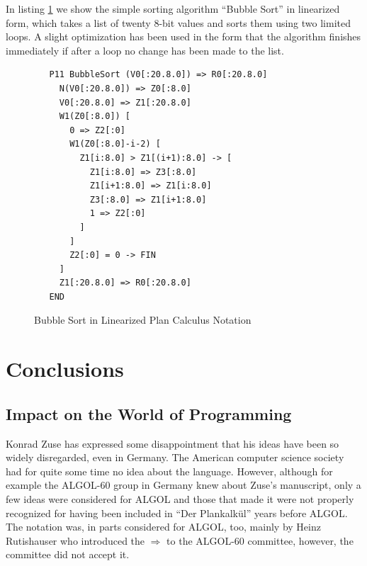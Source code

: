 \documentclass{llncs}
\begin{document}
 In listing \ref{fig:bubblesort} we show the simple sorting algorithm ``Bubble Sort'' in linearized form, 
 which takes a list of twenty 8-bit values and sorts them using two limited loops. A slight optimization has
 been used in the form that the algorithm finishes immediately if after a loop no change has been made
 to the list.
 \begin{figure}
   \begin{lstlisting}
   P11 BubbleSort (V0[:20.8.0]) => R0[:20.8.0]
     N(V0[:20.8.0]) => Z0[:8.0]
     V0[:20.8.0] => Z1[:20.8.0]
     W1(Z0[:8.0]) [
       0 => Z2[:0]
       W1(Z0[:8.0]-i-2) [
         Z1[i:8.0] > Z1[(i+1):8.0] -> [
           Z1[i:8.0] => Z3[:8.0]
           Z1[i+1:8.0] => Z1[i:8.0]
           Z3[:8.0] => Z1[i+1:8.0]
           1 => Z2[:0]
         ]
       ]
       Z2[:0] = 0 -> FIN
     ]
     Z1[:20.8.0] => R0[:20.8.0]
   END
   \end{lstlisting}
   \caption{Bubble Sort in Linearized Plan Calculus Notation}
   \label{fig:bubblesort}
 \end{figure}

 \section{Conclusions}
 \subsection{Impact on the World of Programming}
   Konrad Zuse has expressed some disappointment that his ideas have
   been so widely disregarded, even in Germany\cite{giloi2002konrad}. 
   The American computer science society had for quite some time 
   no idea about the language. However, although 
   for example the ALGOL-60 group in Germany knew about Zuse's manuscript, 
   only a few ideas were considered for ALGOL and those that made it 
   were not properly recognized for having been included in ``Der Plankalkül''
   years before ALGOL\cite{giloi2002konrad}. The notation was, in parts considered 
   for ALGOL, too, mainly by Heinz Rutishauser who introduced the $\Rightarrow$ 
   to the ALGOL-60 committee, however, the committee did not accept it\cite{epegmagHorstzuse}.
\end{document}
